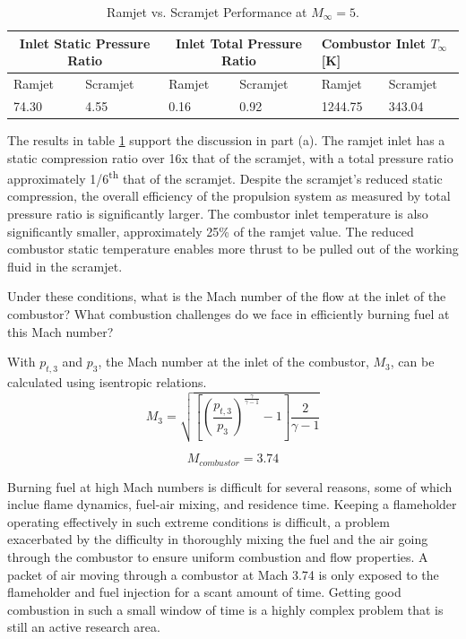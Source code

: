 \documentclass[../main.tex]{subfiles}
\begin{document}
\begin{table}[h!]
    \begin{tabular}{|ll|ll|ll|}
    \hline
    \multicolumn{2}{|c|}{\textbf{Inlet Static Pressure Ratio}} & \multicolumn{2}{c|}{\textbf{Inlet Total Pressure Ratio}} & \multicolumn{2}{l|}{\textbf{Combustor Inlet \(T_\infty\) {[}K{]}}} \\ \hline
    \multicolumn{1}{|l|}{Ramjet}           & Scramjet          & \multicolumn{1}{l|}{Ramjet}          & Scramjet          & \multicolumn{1}{l|}{Ramjet}                   & Scramjet                 \\ \hline
    \multicolumn{1}{|l|}{74.30}            & 4.55              & \multicolumn{1}{l|}{0.16}            & 0.92              & \multicolumn{1}{l|}{1244.75}                  & 343.04                   \\ \hline
    \end{tabular}
    \caption{Ramjet vs. Scramjet Performance at \(M_\infty=5\).}
    \label{table}
\end{table}

The results in table \ref{table} support the discussion in part (a). 
The ramjet inlet has a static compression ratio over 16x that of the scramjet, with a total pressure ratio approximately 1/6\textsuperscript{th} that of the scramjet. 
Despite the scramjet's reduced static compression, the overall efficiency of the propulsion system as measured by total pressure ratio is significantly larger.
The combustor inlet temperature is also significantly smaller, approximately 25\% of the ramjet value.
The reduced combustor static temperature enables more thrust to be pulled out of the working fluid in the scramjet.


Under these conditions, what is the Mach number of the flow at the inlet of the combustor? 
What combustion challenges do we face in efficiently burning fuel at this Mach number?

\solution{}
With \(p_{t,3}\) and \(p_3\), the Mach number at the inlet of the combustor, \(M_3\), can be calculated using isentropic relations.
\[
    M_3 = \sqrt{
        \left[{\left(\frac{p_{t,3}}{p_3}\right)^\frac{\gamma}{\gamma-1} - 1}\right] \frac{2}{\gamma-1}
    }
\]

\[
    M_{combustor} = 3.74
\]

Burning fuel at high Mach numbers is difficult for several reasons, some of which inclue flame dynamics, fuel-air mixing, and residence time.
Keeping a flameholder operating effectively in such extreme conditions is difficult, a problem exacerbated by the difficulty in thoroughly mixing the fuel and the air going through the combustor to ensure uniform combustion and flow properties.
A packet of air moving through a combustor at Mach 3.74 is only exposed to the flameholder and fuel injection for a scant amount of time.
Getting good combustion in such a small window of time is a highly complex problem that is still an active research area.
\end{document}
